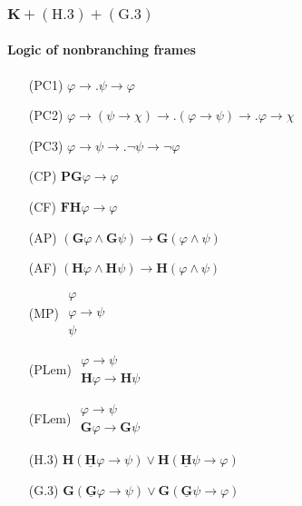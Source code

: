 \documentclass[xcolor=x11names]{beamer}
\newcommand{\FD}{\mathbf F}
\newcommand{\FB}{\mathbf G}
\newcommand{\PD}{\mathbf P}
\newcommand{\PB}{\mathbf H}
\newcommand{\FBDot}{\underline{\mathbf G}}
\newcommand{\PBDot}{\underline{\mathbf H}}
\newcommand{\lrule}[3][c]{\begin{array}{#1} #2  \\  \hline #3 \end{array}}
\newcommand{\lthen}{\rightarrow}
\begin{document}
\begin{frame}[t]
\frametitle{$\mathbf K+ (\mathrm H.3)+ (\mathrm G.3)$}
\framesubtitle{Logic of nonbranching frames}
\footnotesize
\begin{minipage}[t]{5.78cm}
\begin{itemize}
\item[(PC1)] $\varphi \lthen .\psi \lthen \varphi$
\item[(PC2)] $\varphi\lthen (\psi \lthen \chi) \lthen\!\!. (\varphi \lthen \psi) \lthen\!\! . \varphi \lthen \chi$
\item[(PC3)] $\varphi \lthen \psi \lthen .\lnot \psi \lthen \lnot \varphi$
\item[(CP)] $\PD\FB\varphi \lthen \varphi $
\item[(CF)] $\FD\PB\varphi \lthen \varphi$
\item[(AP)] $(\FB\varphi \land \FB \psi )\lthen \FB(\varphi \land \psi )$
\item[(AF)] $(\PB\varphi \land \PB \psi )\lthen \PB(\varphi \land \psi )$
\item[(MP)] $\lrule {\varphi \\ \varphi \lthen \psi}{\psi}$
\item[(PLem)] $\lrule{\varphi\lthen \psi}{\PB\varphi \lthen \PB\psi}$
\item[(FLem)] $\lrule{\varphi\lthen \psi}{\FB\varphi \lthen \FB\psi}$
\end{itemize}
\end{minipage}\quad
\begin{minipage}[t]{4.5cm}
\begin{itemize}
\item[(H.3)] $\PB(\PBDot \varphi\lthen \psi ) \lor \PB(\PBDot \psi\lthen \varphi )$
\item[(G.3)] $\FB(\FBDot \varphi\lthen \psi ) \lor \FB(\FBDot \psi\lthen \varphi )$
\end{itemize}
\end{minipage}
\end{frame}

\end{document}
